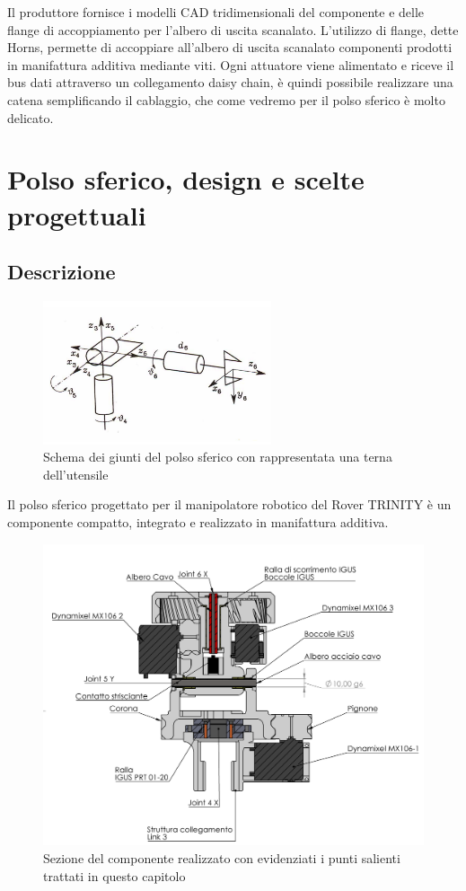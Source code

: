 \documentclass[%
corpo=11pt,
twoside,
 stile=classica,
oldstyle,
greek,%
]{toptesi}
\begin{document}
	Il produttore fornisce i modelli CAD tridimensionali del componente e delle flange di accoppiamento per l'albero di uscita scanalato. L'utilizzo di flange, dette Horns, permette di accoppiare all'albero di uscita scanalato componenti prodotti in manifattura additiva mediante viti. 
	Ogni attuatore viene alimentato e riceve il bus dati attraverso un collegamento daisy chain, è quindi possibile realizzare una catena semplificando il cablaggio, che come vedremo per il polso sferico è molto delicato. 

		
\chapter{Polso sferico, design e scelte progettuali}
	\section{Descrizione}
	\begin{figure}
		\centering
		\includegraphics[width=0.6\textwidth]{image/sferico.png}
		\caption{Schema dei giunti del polso sferico con rappresentata una terna dell'utensile}
		\label{fig:sferico}
	\end{figure}
	Il polso sferico progettato per il manipolatore robotico del Rover TRINITY è un componente compatto, integrato e realizzato in manifattura additiva. 
	\begin{figure}
		\centering
		\includegraphics[width=1.2\textwidth]{Screen/wristsection.png}
		\caption{Sezione del componente realizzato con evidenziati i punti salienti trattati in questo capitolo}
		\label{fig:disegnosferico}
	\end{figure} 
\end{document}
